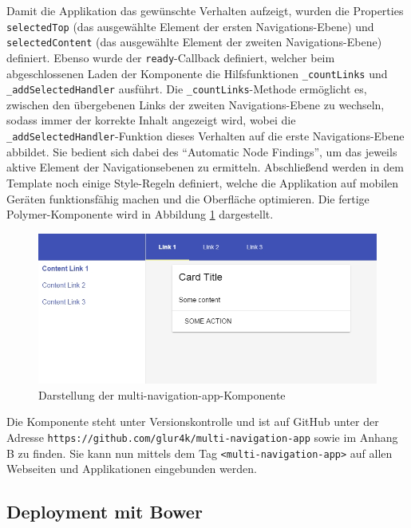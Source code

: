 Damit die Applikation das gewünschte Verhalten aufzeigt, wurden die Properties \texttt{selectedTop} (das ausgewählte Element der ersten Navigations-Ebene) und \texttt{selectedContent} (das ausgewählte Element der zweiten Navigations-Ebene) definiert. Ebenso wurde der \texttt{ready}-Callback definiert, welcher beim abgeschlossenen Laden der Komponente die Hilfsfunktionen \texttt{\_countLinks} und \texttt{\_addSelectedHandler} ausführt. Die \texttt{\_countLinks}-Methode ermöglicht es, zwischen den übergebenen Links der zweiten Navigations-Ebene zu wechseln, sodass immer der korrekte Inhalt angezeigt wird, wobei die \texttt{\_addSelectedHandler}-Funktion dieses Verhalten auf die erste Navigations-Ebene abbildet. Sie bedient sich dabei des ``Automatic Node Findings'', um das jeweils aktive Element der Navigationsebenen zu ermitteln. Abschließend werden in dem Template noch einige Style-Regeln definiert, welche die Applikation auf mobilen Geräten funktionsfähig machen und die Oberfläche optimieren. Die fertige Polymer-Komponente wird in Abbildung \ref{fig:ddmnak} dargestellt.

\begin{figure}[htbp]
 \centering
 \includegraphics[width=12cm]{kapitel7/bilder/1-multi-navigation-app}
 \caption{Darstellung der multi-navigation-app-Komponente}
 \label{fig:ddmnak}
\end{figure}

Die Komponente steht unter Versionskontrolle und ist auf GitHub unter der Adresse \texttt{https://github.com/glur4k/multi-navigation-app} sowie im Anhang B zu finden. Sie kann nun mittels dem Tag \texttt{\textless{}multi-navigation-app\textgreater{}} auf allen Webseiten und Applikationen eingebunden werden.


\subsection{Deployment mit Bower}\label{deployment-mit-bower}

